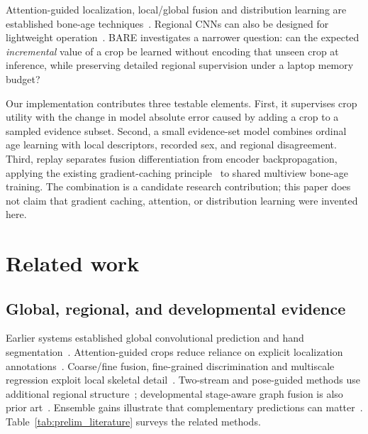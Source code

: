 \documentclass[nolineno]{ieeeaccess}
\begin{document}
Attention-guided localization, local/global fusion and distribution learning are established bone-age techniques~\cite{chen,cfjl,selfsupervised,rfga,bonet,bogff,bonetplus,integral}. Regional CNNs can also be designed for lightweight operation~\cite{lightweight}. BARE investigates a narrower question: can the expected \emph{incremental} value of a crop be learned without encoding that unseen crop at inference, while preserving detailed regional supervision under a laptop memory budget?

Our implementation contributes three testable elements. First, it supervises crop utility with the change in model absolute error caused by adding a crop to a sampled evidence subset. Second, a small evidence-set model combines ordinal age learning with local descriptors, recorded sex, and regional disagreement. Third, replay separates fusion differentiation from encoder backpropagation, applying the existing gradient-caching principle~\cite{gradcache} to shared multiview bone-age training. The combination is a candidate research contribution; this paper does not claim that gradient caching, attention, or distribution learning were invented here.

\section{Related work}
\subsection{Global, regional, and developmental evidence}
Earlier systems established global convolutional prediction and hand segmentation~\cite{spampinato,lee,larson,iglovikov}. Attention-guided crops reduce reliance on explicit localization annotations~\cite{chen,selfsupervised}. Coarse/fine fusion, fine-grained discrimination and multiscale regression exploit local skeletal detail~\cite{cfjl,rfga,bogff}. Two-stream and pose-guided methods use additional regional structure~\cite{bonet,bonetplus}; developmental stage-aware graph fusion is also prior art~\cite{stage}. Ensemble gains illustrate that complementary predictions can matter~\cite{ensemble}. Table~\ref{tab:prelim_literature} surveys the related methods.



\end{document}

